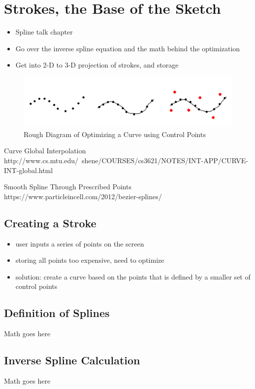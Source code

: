 \documentclass[12pt]{report}
\begin{document}
\pagebreak

\chapter{Strokes, the Base of the Sketch}

\begin{itemize}
\item Spline talk chapter
\item Go over the inverse spline equation and the math behind the optimization
\item Get into 2-D to 3-D projection of strokes, and storage
\end{itemize}

\begin{figure}
\includegraphics[width=0.9\linewidth]{CreatingACurve}
\caption{Rough Diagram of Optimizing a Curve using Control Points}
\end{figure}

Curve Global Interpolation http://www.cs.mtu.edu/~shene/COURSES/cs3621/NOTES/INT-APP/CURVE-INT-global.html

Smooth Spline Through Prescribed Points https://www.particleincell.com/2012/bezier-splines/

\section{Creating a Stroke}
\begin{itemize}
\item user inputs a series of points on the screen
\item storing all points too expensive, need to optimize
\item solution: create a curve based on the points that is defined by a smaller set of control points
\end{itemize}

\section{Definition of Splines}

Math goes here

\section{Inverse Spline Calculation}
Math goes here
\end{document}
